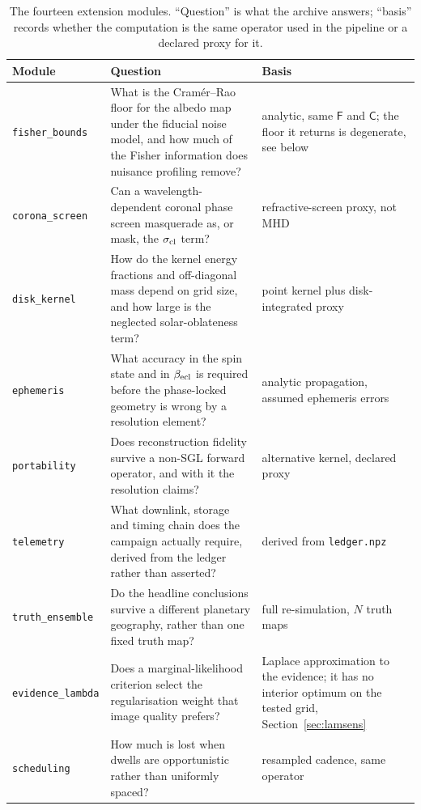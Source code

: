 \documentclass[twocolumn,10pt]{article}
\begin{document}
\begin{table}[t]
\centering
\caption{The fourteen extension modules. ``Question'' is what the archive
answers; ``basis'' records whether the computation is the same operator used in
the pipeline or a declared proxy for it.}
\label{tab:ext}
\footnotesize
\setlength{\tabcolsep}{4pt}
\renewcommand{\arraystretch}{1.15}
\begin{tabular}{p{3.05cm}p{8.0cm}p{3.6cm}}
\toprule
Module & Question & Basis \\
\midrule
{\tt fisher\_bounds} & What is the Cram\'er--Rao floor for the albedo map under
the fiducial noise model, and how much of the Fisher information does nuisance
profiling remove? & analytic, same $\mathsf{F}$ and $\mathsf{C}$; the floor it
returns is degenerate, see below \\
{\tt corona\_screen} & Can a wavelength-dependent coronal phase screen masquerade
as, or mask, the $\sigma_{\rm cl}$ term? & refractive-screen proxy, not MHD \\
{\tt disk\_kernel} & How do the kernel energy fractions and off-diagonal mass
depend on grid size, and how large is the neglected solar-oblateness term? &
point kernel plus disk-integrated proxy \\
{\tt ephemeris} & What accuracy in the spin state and in $\beta_{\rm ecl}$ is
required before the phase-locked geometry is wrong by a resolution element? &
analytic propagation, assumed ephemeris errors \\
{\tt portability} & Does reconstruction fidelity survive a non-SGL forward
operator, and with it the resolution claims? & alternative kernel, declared proxy \\
{\tt telemetry} & What downlink, storage and timing chain does the campaign
actually require, derived from the ledger rather than asserted? & derived from
{\tt ledger.npz} \\
{\tt truth\_ensemble} & Do the headline conclusions survive a different planetary
geography, rather than one fixed truth map? & full re-simulation, $N$ truth maps \\
{\tt evidence\_lambda} & Does a marginal-likelihood criterion select the
regularisation weight that image quality prefers? & Laplace approximation to the
evidence; it has no interior optimum on the tested grid, Section~\ref{sec:lamsens} \\
{\tt scheduling} & How much is lost when dwells are opportunistic rather than
uniformly spaced? & resampled cadence, same operator \\

\end{tabular}
\end{table}
\end{document}
